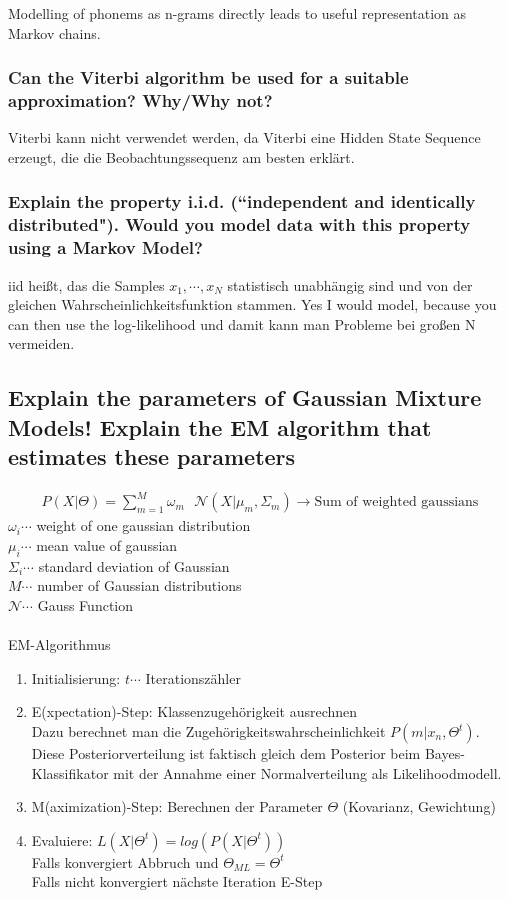 \documentclass[12pt]{scrartcl}
\begin{document}
Modelling of phonems as n-grams directly leads to useful representation as Markov chains.

\subsubsection{Can the Viterbi algorithm be used for a suitable approximation? Why/Why not?}
\label{Viterbi}
Viterbi kann nicht verwendet werden, da Viterbi eine Hidden State Sequence erzeugt, die die Beobachtungssequenz am besten erklärt.

\subsubsection{Explain the property i.i.d. (``independent and identically distributed"). Would you model data with this property using a Markov Model?}

iid heißt, das die Samples $x_1, \cdots ,x_N$ statistisch unabhängig sind und von der gleichen Wahrscheinlichkeitsfunktion stammen. Yes I would model, because you can then use the log-likelihood und damit kann man Probleme bei großen N vermeiden.

\subsection{Explain the parameters of Gaussian Mixture Models! Explain the EM algorithm that estimates these parameters}

\begin{align*}
P(X|\Theta) = \sum_{m=1}^M \omega_m \text{ } \mathcal{N}(X|\mu_m, \Sigma_m) \rightarrow \text{Sum of weighted gaussians}
\end{align*}
$\omega_i \cdots$ weight of one gaussian distribution \\
$\mu_i \cdots$ mean value of gaussian \\
$\Sigma_i \cdots$ standard deviation of Gaussian \\
$M \cdots$ number of Gaussian distributions \\
$\mathcal{N} \cdots$ Gauss Function \\
\\
EM-Algorithmus
\begin{enumerate}
\item Initialisierung: $t \cdots$ Iterationszähler
\item E(xpectation)-Step: Klassenzugehörigkeit ausrechnen \\
Dazu berechnet man die Zugehörigkeitswahrscheinlichkeit $P(m|x_n,\Theta^t)$. Diese Posteriorverteilung ist faktisch gleich dem Posterior beim Bayes-Klassifikator mit der Annahme einer Normalverteilung als Likelihoodmodell.
\item M(aximization)-Step: Berechnen der Parameter $\Theta$ (Kovarianz, Gewichtung)
\item Evaluiere: $L(X|\Theta^t) = log(P(X|\Theta^t))$ \\
Falls konvergiert Abbruch und $\Theta_{ML} = \Theta^t$ \\
Falls nicht konvergiert nächste Iteration E-Step 
\end{enumerate}
\end{document}
